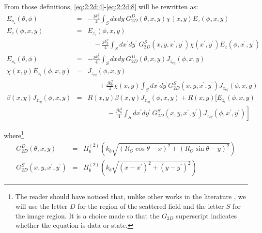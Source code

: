  		From those definitions, \eqref{eq:2:2d:4}-\eqref{eq:2:2d:8} will be rewritten as:
 		\begin{eqnarray}
 			E_{s_z}(\theta,\phi) &=& -\frac{jk_b^2}{4} \int_S dx dy~ G^D_{2D}(\theta,x,y) \chi(x,y) E_z(\phi,x,y)\label{eq:3:definition:4} \\[5pt]
 			E_z(\phi,x,y) &=& E_{z_i}(\phi,x,y) \nonumber \\[5pt]
 			&& ~~~~ - \frac{jk_b^2}{4} \int_S dx^\prime dy^\prime~ G^S_{2D}(x,y,x^\prime,y^\prime) \chi(x^\prime,y^\prime) E_z(\phi,x^\prime,y^\prime) \label{eq:3:definition:5} \\[5pt]
 			E_{s_z}(\theta,\phi) &=& -\frac{jk_b^2}{4} \int_S dxdy~ G^D_{2D}(\theta,x,y) J_{z_{eq}}(\phi,x,y) \label{eq:3:definition:6} \\[5pt]
 			\chi(x,y)E_{z_i}(\phi,x,y) &=& J_{z_{eq}}(\phi,x,y) \nonumber \\[5pt]
 			&& ~~~~~~~ + \frac{jk_b^2}{4} \chi(x,y) \int_S dx^\prime dy^\prime G^S_{2D}(x,y,x^\prime,y^\prime) J_{z_{eq}}(\phi,x,y) \label{eq:3:definition:7} \\[5pt]
 			\beta(x,y)J_{z_{eq}}(\phi,x,y) &=& R(x,y)\beta(x,y)J_{z_{eq}}(\phi,x,y) + R(x,y)\bigg[ E_{z_i}(\phi,x,y) \nonumber \\[5pt]
 			&& \left. ~~~~~~~~~~~~~ - \frac{jk_b^2}{4} \int_S dx^\prime dy^\prime~ G^S_{2D}(x,y,x^\prime,y^\prime) J_{z_{eq}}(\phi,x^\prime,y^\prime)\right] \label{eq:3:definition:8}
 		\end{eqnarray}
 	
 		\noindent where\footnote{The reader should have noticed that, unlike other works in the literature \citep{chen2017}, we will use the letter $D$ for the region of the scattered field and the letter $S$ for the image region. It is a choice made so that the $G_{2D}$ superscript indicates whether the equation is data or state.}
 		\begin{eqnarray}
 			G^D_{2D}(\theta,x,y) &=&  H_0^{(2)}(k_b\sqrt{(R_O\cos\theta-x)^2+(R_O\sin\theta-y)^2}) \label{eq:3:definition:9} \\[5pt]
 			G^S_{2D}(x,y,x^\prime,y^\prime) &=&  H_0^{(2)}(k_b\sqrt{(x-x^\prime)^2+(y-y^\prime)^2}) \label{eq:3:definition:10}
 		\end{eqnarray}
 	
